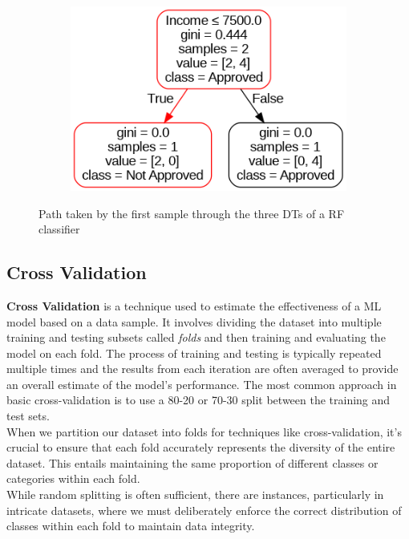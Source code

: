 \begin{figure}[H]
\begin{subfigure}{0.45\linewidth}
    \caption{}
    \label{fig:rfTree1}
  \end{subfigure}
  \begin{subfigure}{0.39\linewidth}
    \includegraphics[width=\linewidth]{graphics/loan_RF_0.png}
    \caption{}
    \label{fig:rfTree2}
  \end{subfigure}
  \caption{Path taken by the first sample through the three DTs of a RF classifier}
  \label{fig:rf}
\end{figure}


\subsection{Cross Validation}
\label{subsec:cross_validation}

\textbf{Cross Validation} is a technique used to estimate the effectiveness of a ML model based on a data sample.
It involves dividing the dataset into multiple training and testing subsets called \textit{folds} and then training and evaluating the model on each fold.
The process of training and testing is typically repeated multiple times and the results from each iteration are often averaged to provide an overall estimate of the model's performance.
The most common approach in basic cross-validation is to use a 80-20 or 70-30 split between the training and test sets.\\
When we partition our dataset into folds for techniques like cross-validation, it's crucial to ensure that each fold accurately represents the diversity of the entire dataset. 
This entails maintaining the same proportion of different classes or categories within each fold.\\ 
While random splitting is often sufficient, there are instances, particularly in intricate datasets, where we must deliberately enforce the correct distribution of classes within each fold to maintain data integrity.
\\

